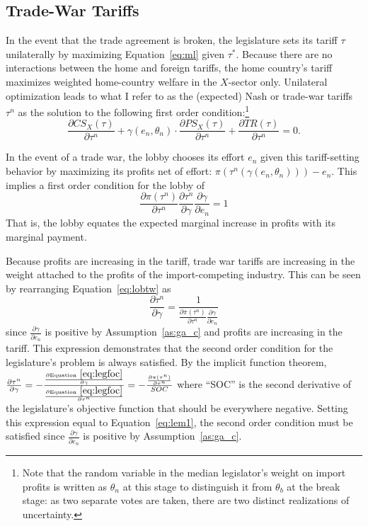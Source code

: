 \documentclass[10pt]{article}
\newcommand{\ve}{\theta}
\newcommand{\ta}{\theta}
\newcommand{\ga}{\gamma}
\begin{document}
\subsection{Trade-War Tariffs}
\label{sec:twt}
In the event that the trade agreement is broken, the legislature sets its tariff $\tau$ unilaterally by maximizing Equation~\ref{eq:ml} given $\tau^*$. Because there are no interactions between the home and foreign tariffs, the home country's tariff maximizes weighted home-country welfare in the $X$-sector only. Unilateral optimization leads to what I refer to as the (expected) Nash or trade-war tariffs $\tau^n$ as the solution to the following first order condition:\footnote{Note that the random variable in the median legislator's weight on import profits is written as $\ta_n$ at this stage to distinguish it from $\ta_b$ at the break stage: as two separate votes are taken, there are two distinct realizations of uncertainty.}
\begin{equation}
		\frac{\partial \mathit{CS}_X(\tau)}{\partial \tau^n} + \ga(e_n,\ve_n) \cdot \frac{\partial \mathit{PS}_X(\tau)}{\partial \tau^n} +  \frac{\partial \mathit{TR}(\tau)}{\partial \tau^n} = 0 .
		\label{eq:legfoc}
\end{equation}

In the event of a trade war, the lobby chooses its effort $e_n$ given this tariff-setting behavior by maximizing its profits net of effort: $\pi\left(\tau^n\left(\ga\left(e_n,\ve_n\right)\right)\right) - e_n$. This implies a first order condition for the lobby of
\begin{equation}
	\frac{\partial \pi(\tau^n)}{\partial \tau^n}\frac{\partial \tau^n}{\partial \ga} \frac{\partial \ga}{\partial e_n} = 1
  \label{eq:lobtw}
\end{equation}
That is, the lobby equates the expected marginal increase in profits with its marginal payment.

Because profits are increasing in the tariff, trade war tariffs are increasing in the weight attached to the profits of the import-competing industry. This can be seen by rearranging Equation~\ref{eq:lobtw} as 
\begin{equation}
  \frac{\partial \tau^n}{\partial \ga} = \frac{1}{\frac{\partial \pi(\tau^n)}{\partial \tau^n} \frac{\partial \ga}{\partial e_n}}
	\label{eq:lem1}
\end{equation}
since $\frac{\partial \ga}{\partial e_n}$ is positive by Assumption~\ref{as:ga_c} and profits are increasing in the tariff. This expression demonstrates that the second order condition for the legislature's problem is always satisfied. By the implicit function theorem, $\frac{\partial \tau^n}{\partial \ga} = -\frac{\frac{\partial \text{Equation}~\ref{eq:legfoc}}{\partial \ga}}{\frac{\partial \text{Equation}~\ref{eq:legfoc}}{\partial \tau^n}} = -\frac{\frac{\partial \pi(\tau^n)}{\partial \tau^n}}{SOC}$ where ``SOC'' is the second derivative of the legislature's objective function that should be everywhere negative. Setting this expression equal to Equation~\ref{eq:lem1}, the second order condition must be satisfied since $\frac{\partial \ga}{\partial e_n}$ is positive by Assumption~\ref{as:ga_c}.
\end{document}
